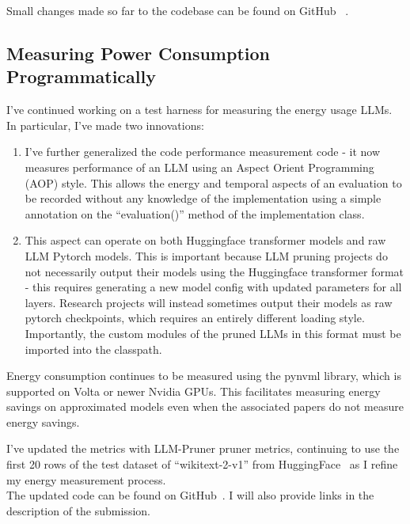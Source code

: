 \documentclass{article}
\begin{document}
    Small changes made so far to the codebase can be found on GitHub ~\cite{llm-pruner-pr}.

    \subsection{Measuring Power Consumption Programmatically}\label{subsec:measuring-power-consumption-locally}
    I've continued working on a test harness for measuring the energy usage LLMs. In particular, I've made two innovations:

    \begin{enumerate}
        \item I've further generalized the code performance measurement code - it now measures performance of an LLM using an Aspect Orient Programming (AOP) style.
        This allows the energy and temporal aspects of an evaluation to be recorded without any knowledge of the implementation using a simple annotation on the ``evaluation()'' method of the implementation class.
        \item This aspect can operate on both Huggingface transformer models and raw LLM Pytorch models.
        This is important because LLM pruning projects do not necessarily output their models using the Huggingface transformer format - this requires generating a new model config with updated parameters for all layers.
        Research projects will instead sometimes output their models as raw pytorch checkpoints, which requires an entirely different loading style.
        Importantly, the custom modules of the pruned LLMs in this format must be imported into the classpath.
    \end{enumerate}

    Energy consumption continues to be measured using the pynvml library, which is supported on Volta or newer Nvidia GPUs. This facilitates measuring energy savings on approximated models even when the associated papers do not measure energy savings.

    I've updated the metrics with LLM-Pruner pruner metrics, continuing to use the first 20 rows of the test dataset of ``wikitext-2-v1'' from HuggingFace~\cite{merity2016pointersentinelmixturemodels} as I refine my energy measurement process.
    \\
    The updated code can be found on GitHub~\cite{llm-test-runner}.
    I will also provide links in the description of the submission.
\end{document}
